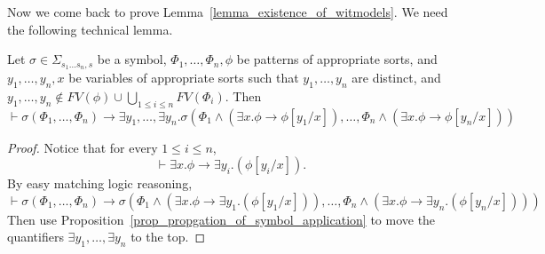 \documentclass[acmsmall]{acmart}
\theoremstyle{acmdefinition}
\newcommand{\imp}{\to}
\newcommand{\fv}{\mathit{FV}}
\newcommand{\FV}{\fv}
\newcommand{\ddd}{,\dots,}
\newcommand{\SigmaSub}[1]{\Sigma_{#1}}
\begin{document}
\begin{comment}


\begin{lemma}
\label{lemma_lemma_for_proving_existence_of_witmodels}
The following pattern is provable
$$
\sigma(\varphi_1 \ddd \varphi_{i-1} , \varphi_i , \varphi_{i+1} \ddd \varphi_n) 
\imp
\exists y_i . \sigma( \varphi_1 \ddd \varphi_{i-1} ,
                      (\exists x_i . \psi \imp \psi[y_i/x_i]) \wedge \varphi_i  
                      , \varphi_{i+1} \ddd \varphi_n )
$$
if $y_i$ does not occur free in it or in $\psi$.
\end{lemma}
\begin{proof}
By standard first-order reasoning.
\end{proof}

\end{comment}

Now we come back to prove Lemma~\ref{lemma_existence_of_witmodels}.
We need the following technical lemma.

\begin{lemma}
\label{lemma_existence_of_witmodels_lemma}
Let $\sigma \in \SigmaSub{s_1 \dots s_n , s}$ be a symbol,
$\Phi_1 \ddd \Phi_n, \phi$ be patterns 
of appropriate sorts,
and
$y_1 \ddd y_n,x$ be variables of appropriate sorts
such that $y_1 \ddd y_n$ are distinct,
and
$y_1 \ddd y_n \not\in
 \FV(\phi)\cup
 \bigcup_{1 \le i \le n} 
 \FV(\Phi_i) 
$.
Then
$$
\vdash
\sigma(\Phi_1 \ddd \Phi_n) \imp
\exists y_1 \ddd \exists y_n . 
\sigma(\Phi_1 \wedge (\exists x . \phi \imp \phi [y_1/x])
\ddd   \Phi_n \wedge (\exists x . \phi \imp \phi [y_n/x]))
$$
\end{lemma}
\begin{proof}
Notice that for every $1 \le i \le n$,
$$\vdash \exists x . \phi 
  \imp \exists y_i . (\phi[y_i/x]).$$
By easy matching logic reasoning,
$$
\vdash
\sigma(\Phi_1 \ddd \Phi_n) \imp
\sigma(\Phi_1 \wedge (\exists x . \phi \imp \exists y_1 . (\phi[y_1/x]))
\ddd   \Phi_n \wedge (\exists x . \phi \imp \exists y_n . (\phi[y_n/x])))
$$
Then use Proposition~\ref{prop_propgation_of_symbol_application} 
to move the quantifiers
$\exists y_1 \ddd \exists y_n$ to the top.
\end{proof}

\existenceLemma*
\end{document}
